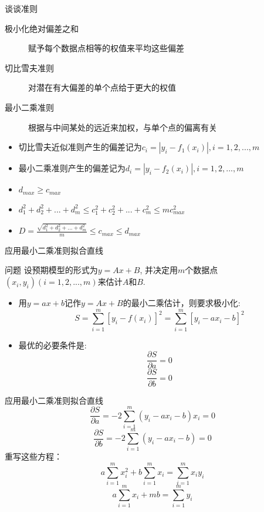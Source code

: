 \documentclass[UTF8]{ctexbeamer}
\begin{document}
\begin{frame}{谈谈准则}
  \begin{description}
  \item[极小化绝对偏差之和] 赋予每个数据点相等的权值来平均这些偏差
  \item[切比雪夫准则] 对潜在有大偏差的单个点给于更大的权值
  \item[最小二乘准则] 根据与中间某处的远近来加权，与单个点的偏离有关
  \end{description}

  \begin{itemize}
  \item 切比雪夫近似准则产生的偏差记为$c_i = |y_i - f_1(x_i)|, i=1,2,...,m$
  \item 最小二乘准则产生的偏差记为$d_i = |y_i - f_2(x_i)|, i=1,2,...,m$
  \item $d_{max} \ge c_{max}$
  \item $d_1^2+d_2^2+...+d_m^2 \le c_1^2+c_2^2+...+c_m^2 \le mc_{max}^2$
  \item $D=\frac{\sqrt{d_1^2+d_2^2+...+d_m^2}}{m} \le c_{max} \le d_{max}$
  \end{itemize}

\end{frame}

\begin{frame}{应用最小二乘准则拟合直线}
  \begin{block}{问题}
    设预期模型的形式为$y=Ax+B$, 并决定用$m$个数据点$(x_i, y_i)(i=1,2,...,m)$来估计$A$和$B$.
  \end{block}
  
  \begin{itemize}
  \item 用$y=ax+b$记作$y=Ax+B$的最小二乘估计，则要求极小化:
    \[
    S=\sum_{i=1}^m[y_i-f(x_i)]^2=\sum_{i=1}^m[y_i-ax_i-b]^2
    \]
  \item 最优的必要条件是:
    \[
    \frac{\partial S}{\partial a} = 0
    \]
    \[
    \frac{\partial S}{\partial b} = 0
    \]
  \end{itemize}
\end{frame}

\begin{frame}{应用最小二乘准则拟合直线}
  \[
  \frac{\partial S}{\partial a} = -2\sum_{i=1}^m(y_i-ax_i-b)x_i = 0
  \]
  \[
  \frac{\partial S}{\partial b} = -2\sum_{i=1}^m(y_i-ax_i-b) = 0
  \]
  重写这些方程：
  \[
  a\sum_{i=1}^mx_i^2 + b\sum_{i=1}^mx_i = \sum_{i=1}^mx_iy_i
  \]
  \[
  a\sum_{i=1}^mx_i + mb = \sum_{i=1}^my_i
  \]
\end{frame}
\end{document}
